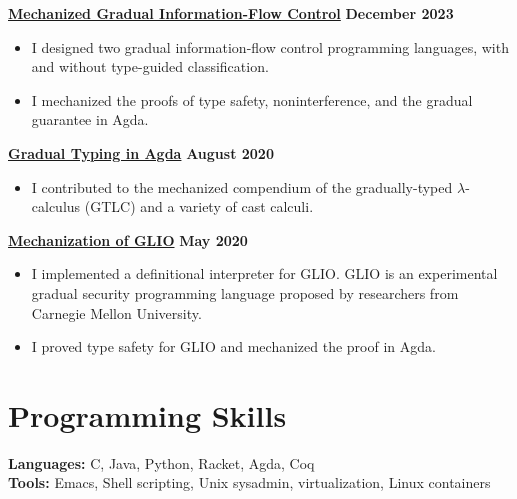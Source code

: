 {\bf \href{https://github.com/Gradual-Typing/LambdaIFCStar}{Mechanized Gradual Information-Flow Control}}
\hfill {\bf December 2023}
\begin{itemize}
\item I designed two gradual information-flow control programming languages,
  with and without type-guided classification.
\item I mechanized the proofs of type safety, noninterference, and the gradual
  guarantee in Agda.
\end{itemize}
{\bf \href{https://github.com/jsiek/gradual-typing-in-agda}{Gradual Typing in Agda}}
\hfill {\bf August 2020}
\begin{itemize}
\item I contributed to the mechanized compendium of the gradually-typed
  $\lambda$-calculus (GTLC) and a variety of cast calculi.
\end{itemize}
{\bf \href{https://github.com/Gradual-Typing/lambda-sec/tree/master/glio}{Mechanization of GLIO}}
\hfill {\bf May 2020}
\begin{itemize}
\item I implemented a definitional interpreter for GLIO. GLIO is an experimental
  gradual security programming language proposed by researchers from Carnegie
  Mellon University.
\item I proved type safety for GLIO and mechanized the proof in Agda.
\end{itemize}


\section*{\sc Programming Skills}

{\bf Languages: } C, Java, Python, Racket, Agda, Coq \\
{\bf Tools: } Emacs, Shell scripting, Unix sysadmin, virtualization, Linux containers

